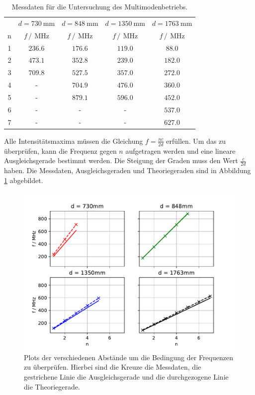 \FloatBarrier
\begin{table}
  \centering
  \caption{Messdaten für die Untersuchung des Multimodenbetriebs.}
  \label{tab:Multimodenbetrieb}
  \begin{tabular}{c c c c c}
    \toprule
    &$d=\SI{730}{\milli\meter}$&$d=\SI{848}{\milli\meter}$&$d=\SI{1350}{\milli\meter}$&$d=\SI{1763}{\milli\meter}$\\
    n&$f\,/\,\SI{}{\mega\hertz}$&$f\,/\,\SI{}{\mega\hertz}$&$f\,/\,\SI{}{\mega\hertz}$&$f\,/\,\SI{}{\mega\hertz}$\\
    \midrule
    1&$\num{236.6}$&$\num{176.6}$&$\num{119.0}$&$\num{88.0}$\\
    2&$\num{473.1}$&$\num{352.8}$&$\num{239.0}$&$\num{182.0}$\\
    3&$\num{709.8}$&$\num{527.5}$&$\num{357.0}$&$\num{272.0}$\\
    4&-&$\num{704.9}$&$\num{476.0}$&$\num{360.0}$\\
    5&-&$\num{879.1}$&$\num{596.0}$&$\num{452.0}$\\
    6&-&-&-&$\num{537.0}$\\
    7&-&-&-&$\num{627.0}$\\
  \end{tabular}
\end{table}
\FloatBarrier

Alle Intensitätsmaxima müssen die Gleichung $f = \frac{nc}{2d}$ erfüllen. Um das zu überprüfen, kann die 
Frequenz gegen $n$ aufgetragen werden und eine lineare Ausgleichsgerade bestimmt werden. Die Steigung der 
Graden muss den Wert $\frac{c}{2d}$ haben.
Die Messdaten, Ausgleichsgeraden und Theoriegeraden sind in Abbildung \ref{fig:Multimodenbetrieb} abgebildet.

\FloatBarrier
\begin{figure}
  \centering
  \includegraphics[width = \textwidth, keepaspectratio]{figure/Multimode.pdf}
  \caption{Plots der verschiedenen Abstände um die Bedingung der Frequenzen zu überprüfen. Hierbei sind die Kreuze die Messdaten, die gestrichene Linie die Ausgleichsgerade und die durchgezogene Linie die Theoriegerade.}
  \label{fig:Multimodenbetrieb}
\end{figure}
\FloatBarrier


